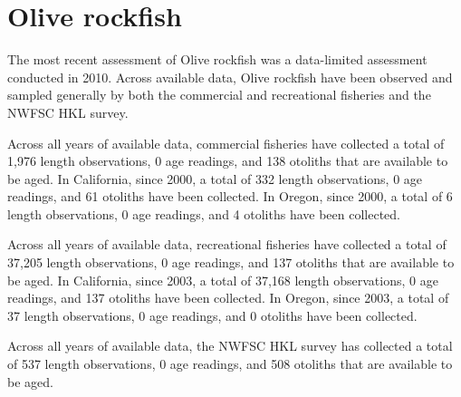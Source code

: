 \documentclass[11pt,
  english,
  letterpaper,
]{article}
\begin{document}

\hypertarget{olive-rockfish}{%
\section{Olive rockfish}\label{olive-rockfish}}

\leavevmode\tagmcend\tagstructend


The most recent assessment of Olive rockfish was a data-limited assessment conducted in 2010. Across available data, Olive rockfish have been observed and sampled generally by both the commercial and recreational fisheries and the NWFSC HKL survey.

\leavevmode\tagmcend\tagstructend\par


Across all years of available data, commercial fisheries have collected a total of 1,976 length observations, 0 age readings, and 138 otoliths that are available to be aged. In California, since 2000, a total of 332 length observations, 0 age readings, and 61 otoliths have been collected. In Oregon, since 2000, a total of 6 length observations, 0 age readings, and 4 otoliths have been collected.

\leavevmode\tagmcend\tagstructend\par


Across all years of available data, recreational fisheries have collected a total of 37,205 length observations, 0 age readings, and 137 otoliths that are available to be aged. In California, since 2003, a total of 37,168 length observations, 0 age readings, and 137 otoliths have been collected. In Oregon, since 2003, a total of 37 length observations, 0 age readings, and 0 otoliths have been collected.

\leavevmode\tagmcend\tagstructend\par


Across all years of available data, the NWFSC HKL survey has collected a total of 537 length observations, 0 age readings, and 508 otoliths that are available to be aged.

\leavevmode\tagmcend\tagstructend\par
\end{document}

